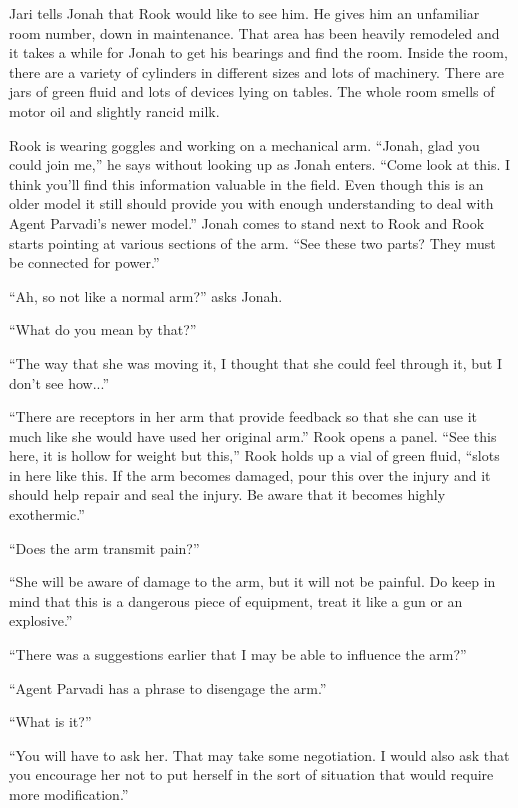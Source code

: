 
Jari tells Jonah that Rook would like to see him.  He gives him an unfamiliar room number, down in maintenance.  That area has been heavily remodeled and it takes a while for Jonah to get his bearings and find the room.  Inside the room, there are a variety of cylinders in different sizes and lots of machinery.  There are jars of green fluid and lots of devices lying on tables. The whole room smells of motor oil and slightly rancid milk.



Rook is wearing goggles and working on a mechanical arm.  ``Jonah, glad you could join me,'' he says without looking up as Jonah enters.  ``Come look at this.  I think you'll find this information valuable in the field.  Even though this is an older model it still should provide you with enough understanding to deal with Agent Parvadi's newer model.''  Jonah comes to stand next to Rook and Rook starts pointing at various sections of the arm. ``See these two parts?  They must be connected for power.''

``Ah, so not like a normal arm?'' asks Jonah.

``What do you mean by that?''

``The way that she was moving it, I thought that she could feel through it, but I don't see how...''

``There are receptors in her arm that provide feedback so that she can use it much like she would have used her original arm.''  Rook opens a panel. ``See this here, it is hollow for weight but this,'' Rook holds up a vial of green fluid, ``slots in here like this.  If the arm becomes damaged, pour this over the injury and it should help repair and seal the injury.  Be aware that it becomes highly exothermic.''

``Does the arm transmit pain?''

``She will be aware of damage to the arm, but it will not be painful.  Do keep in mind that this is a dangerous piece of equipment, treat it like a gun or an explosive.''

``There was a suggestions earlier that I may be able to influence the arm?''

``Agent Parvadi has a phrase to disengage the arm.''

``What is it?''

``You will have to ask her.  That may take some negotiation.  I would also ask that you encourage her not to put herself in the sort of situation that would require more modification.''

